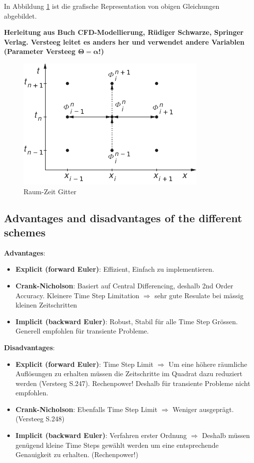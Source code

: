 \documentclass[a4paper]{scrartcl}
\begin{document}
In Abbildung \ref{fig:81} ist die grafische Representation von obigen
Gleichungen abgebildet.

\textbf{Herleitung aus Buch CFD-Modellierung, Rüdiger Schwarze, Springer
Verlag. Versteeg leitet es anders her und verwendet andere Variablen
(Parameter Versteeg $\mathbf{\Theta = \alpha}$!)}

\begin{figure}[h!]
\begin{center}
\includegraphics[scale=1.0]{images/81.pdf}
\caption{Raum-Zeit Gitter}
\label{fig:81}
\end{center}
\end{figure}



\subsection{Advantages and disadvantages of the different schemes}
\textbf{Advantages}:
\begin{itemize}
\item \textbf{Explicit (forward Euler)}: Effizient, Einfach zu implementieren.

\item \textbf{Crank-Nicholson}:  Basiert auf Central Differencing, deshalb 2nd
Order Accuracy. Kleinere Time Step Limitation $\Rightarrow$ sehr gute Resulate
bei mässig kleinen Zeitschritten

\item \textbf{Implicit (backward Euler)}: Robust, Stabil für alle Time Step
Grössen. Generell empfohlen für transiente Probleme.
 

\end{itemize}

\textbf{Disadvantages}:
\begin{itemize}
\item \textbf{Explicit (forward Euler)}: Time Step Limit $\Rightarrow$ Um eine
höhere räumliche Auflösungen zu erhalten müssen die Zeitschritte im Quadrat dazu
reduziert werden (Versteeg S.247). Rechenpower! Deshalb für transiente Probleme
nicht empfohlen.

\item \textbf{Crank-Nicholson}: Ebenfalls Time Step Limit $\Rightarrow$ Weniger
ausgeprägt. (Versteeg S.248)

\item \textbf{Implicit (backward Euler)}: Verfahren erster Ordnung $\Rightarrow$
Deshalb müssen genügend kleine Time Steps gewählt werden um eine entsprechende
Genauigkeit zu erhalten. (Rechenpower!)

\end{itemize}
\end{document}
